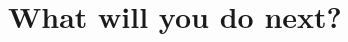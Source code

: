 \documentclass[sigconf]{acmart}
\begin{document}
\section{What will you do next?}
\begin{comment}

Scaling up


Funding 


Shared CPD learning materials


Address EDI issues in computer science


Reverse mentoring


Align with BCS


Special interest group

Web space for repository and functionality (mentoring, buddying) to store CPD sessions, shared resources for new CS academics, examples of good practice and a discussion space.

Explore what BCS are doing with professionals in non academic roles

Encourage research on pedagogy and educational issues in CS

Examine if programme framework is transferrable to other disciplines
\end{comment}
\end{document}
